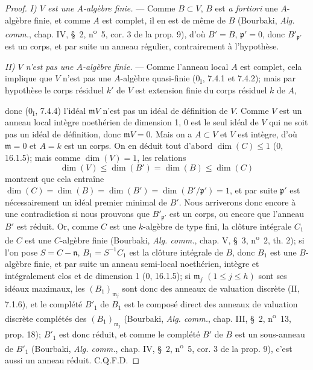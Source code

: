 \begin{proof}
\emph{I) $V$ est une $A$-algèbre finie.} --- Comme $B\subset V$, $B$ est
\emph{a fortiori} une $A$-algèbre finie, et comme $A$ est complet, il en est
de même de $B$ (Bourbaki, \emph{Alg. comm.}, chap. IV, \S~2,
n\textsuperscript{o}~5, cor. 3 de la prop. 9), d'où $B'=B$,
$\mathfrak p'=0$, donc $B'_{\mathfrak p'}$ est un corps, et par suite un
anneau régulier, contrairement à l'hypothèse.

\emph{II) $V$ n'est pas une $A$-algèbre finie.} --- Comme l'anneau local
$A$ est complet, cela implique que $V$ n'est pas une $A$-algèbre
quasi-finie (0$_{\mathrm I}$, 7.4.1 et 7.4.2); mais par hypothèse le corps
résiduel $k'$ de $V$ est extension finie du corps résiduel $k$ de $A$,


donc (0$_{\mathrm I}$, 7.4.4) l'idéal $\mathfrak mV$ n'est pas un idéal de
définition de $V$. Comme $V$ est un anneau local intègre noethérien de
dimension 1, 0 est le seul idéal de $V$ qui ne soit pas un idéal de
définition, donc $\mathfrak mV=0$. Mais on a $A\subset V$ et $V$ est
intègre, d'où $\mathfrak m=0$ et $A=k$ est un corps. On en déduit tout
d'abord $\dim(C)\leqslant1$ (0, 16.1.5); mais comme $\dim(V)=1$, les
relations
\[
\dim(V)\leqslant\dim(B')=\dim(B)\leqslant\dim(C)
\]
montrent que cela entraîne
$\dim(C)=\dim(B)=\dim(B')=\dim(B'/\mathfrak p')=1$, et par suite
$\mathfrak p'$ est nécessairement un idéal premier minimal de $B'$. Nous
arriverons donc encore à une contradiction si nous prouvons que
$B'_{\mathfrak p'}$ est un corps, ou encore que l'anneau $B'$ est réduit.
Or, comme $C$ est une $k$-algèbre de type fini, la clôture intégrale $C_1$
de $C$ est une $C$-algèbre finie (Bourbaki, \emph{Alg. comm.}, chap. V,
\S~3, n\textsuperscript{o}~2, th. 2); si l'on pose
$S=C-\mathfrak n$, $B_1=S^{-1}C_1$ est la clôture intégrale de $B$, donc
$B_1$ est une $B$-algèbre finie, et par suite un anneau semi-local
noethérien, intègre et intégralement clos et de dimension 1 (0, 16.1.5); si
$\mathfrak m_j$ $(1\leqslant j\leqslant h)$ sont ses idéaux maximaux, les
$(B_1)_{\mathfrak m_j}$ sont donc des anneaux de valuation discrète (II,
7.1.6), et le complété $B'_1$ de $B_1$ est le composé direct des anneaux de
valuation discrète complétés des $(B_1)_{\mathfrak m_j}$ (Bourbaki,
\emph{Alg. comm.}, chap. III, \S~2, n\textsuperscript{o}~13, prop. 18);
$B'_1$ est donc réduit, et comme le complété $B'$ de $B$ est un
sous-anneau de $B'_1$ (Bourbaki, \emph{Alg. comm.}, chap. IV, \S~2,
n\textsuperscript{o}~5, cor. 3 de la prop. 9), c'est aussi un anneau réduit.
C.Q.F.D.
\end{proof}

